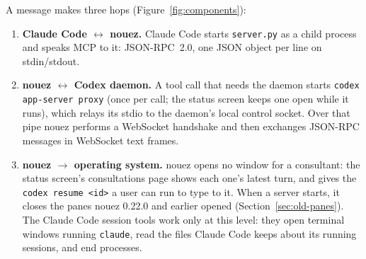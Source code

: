\documentclass[10pt,a4paper]{article}
\newcommand{\code}[1]{\texttt{#1}}
\begin{document}
A message makes three hops (Figure~\ref{fig:components}):

\begin{enumerate}
  \item \textbf{Claude Code $\leftrightarrow$ nouez.} Claude Code starts \code{server.py} as a child
        process and speaks MCP to it: JSON-RPC~2.0, one JSON object per line on stdin/stdout.
  \item \textbf{nouez $\leftrightarrow$ Codex daemon.} A tool call that needs the daemon starts
        \code{codex app-server proxy} (once per call; the status screen keeps one open while it runs),
        which relays its stdio to the daemon's local control socket.
        Over that pipe nouez performs a WebSocket handshake and then exchanges JSON-RPC messages
        in WebSocket text frames.
  \item \textbf{nouez $\rightarrow$ operating system.} nouez opens no window for a consultant: the
        status screen's consultations page shows each one's latest turn, and gives the
        \code{codex resume <id>} a user can run to type to it. When a server starts, it closes the
        panes nouez 0.22.0 and earlier opened (Section~\ref{sec:old-panes}).
        The Claude Code session tools work only at this level: they open terminal windows
        running \code{claude}, read the files Claude Code keeps about its running sessions, and
        end processes.
\end{enumerate}
\end{document}
